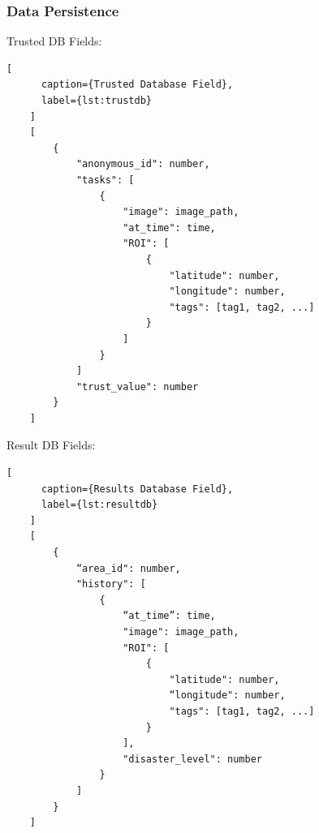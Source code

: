     \subsubsection{Data Persistence}

    Trusted DB Fields:

    \begin{lstlisting}[
      caption={Trusted Database Field},
      label={lst:trustdb}
    ]
    [
        {
            "anonymous_id": number,
            "tasks": [
                {
                    "image": image_path,
                    "at_time": time, 
                    "ROI": [
                        {
                            "latitude": number,
                            "longitude": number,
                            "tags": [tag1, tag2, ...]
                        }
                    ]
                }
            ]
            "trust_value": number
        }
    ]
    \end{lstlisting}

    Result DB Fields:

    \begin{lstlisting}[
      caption={Results Database Field},
      label={lst:resultdb}
    ]
    [
        {
            “area_id": number,
            "history": [
                {
                    “at_time”: time,
                    "image": image_path,
                    "ROI": [
                        {
                            "latitude": number,
                            “longitude": number,
                            "tags": [tag1, tag2, ...]
                        }
                    ],
                    "disaster_level": number
                }
            ]
        }
    ]
    \end{lstlisting}


